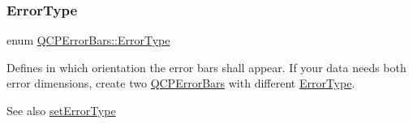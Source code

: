 \subsubsection{\texorpdfstring{Error\+Type}{ErrorType}\hspace{0.1cm}{\footnotesize\ttfamily [2/2]}}
{\footnotesize\ttfamily enum \hyperlink{class_q_c_p_error_bars_a95f0220f11a72648b96480a85ce26474}{Q\+C\+P\+Error\+Bars\+::\+Error\+Type}}

Defines in which orientation the error bars shall appear. If your data needs both error dimensions, create two \hyperlink{class_q_c_p_error_bars}{Q\+C\+P\+Error\+Bars} with different \hyperlink{class_q_c_p_error_bars_a95f0220f11a72648b96480a85ce26474}{Error\+Type}.

\begin{DoxySeeAlso}{See also}
\hyperlink{class_q_c_p_error_bars_af0af493d454a8f3a0908830160680d2b}{set\+Error\+Type} 
\end{DoxySeeAlso}
